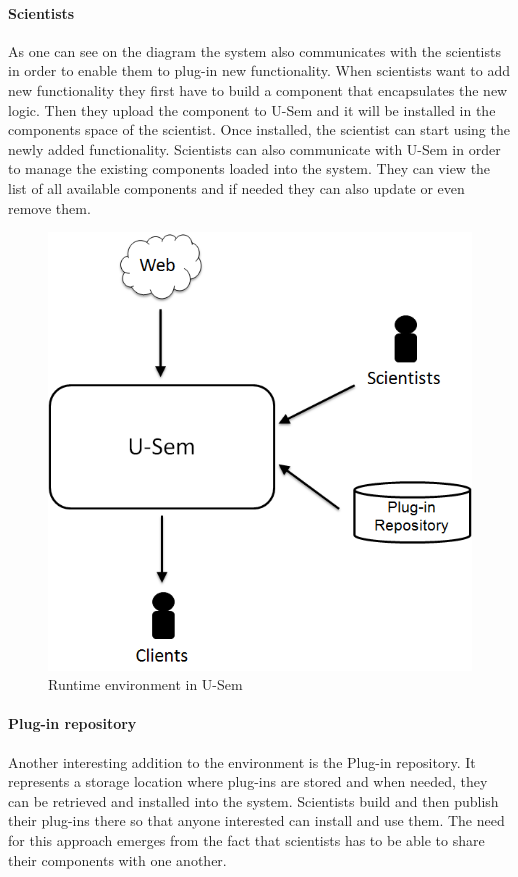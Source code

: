 \paragraph{Scientists}
As one can see on the diagram the system also communicates with the scientists in order to enable them to plug-in new functionality. When scientists want to add new functionality they first have to build a component that encapsulates the new logic. Then they upload the component to U-Sem and it will be installed in the components space of the scientist. Once installed, the scientist can start using the newly added functionality. Scientists can also communicate with U-Sem in order to manage the existing components loaded into the system. They can view the list of all available components and if needed they can also update or even remove them. 

\begin{figure}[h!]
  \centering
  	\includegraphics[scale=0.5]{plug-in/environment/runtime_env.png}
  \caption{Runtime environment in U-Sem }
\end{figure}

\paragraph{Plug-in repository}
Another interesting addition to the environment is the Plug-in repository. It represents a storage location where plug-ins are stored and when needed, they can be retrieved and installed into the system. Scientists build and then publish their plug-ins there so that anyone interested can install and use them. The need for this approach emerges from the fact that scientists has to be able to share their components with one another.

